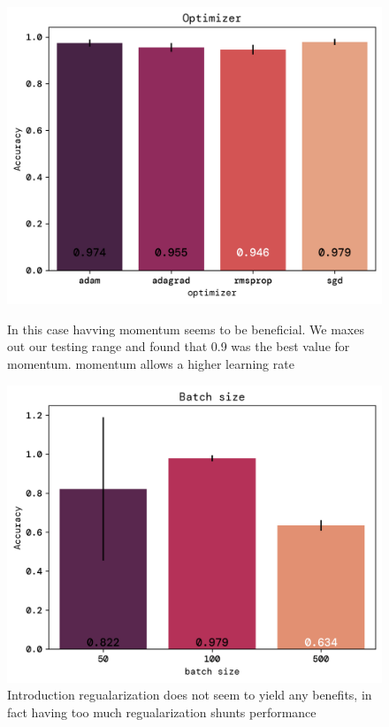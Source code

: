 \documentclass[twoside,11pt]{report}
\begin{document}
\begin{figure}[!ht]
    \begin{minipage}[t]{0.5\textwidth - 1mm}
        \begin{center}
            \includegraphics[width=\textwidth]{../runsAndFigures/accuracy_optimizer.png}
        \end{center}
        \caption{In this case havving momentum seems to be beneficial. We maxes out our testing range and found that 0.9 was the best value for momentum. momentum allows a higher learning rate}\label{fig:accuracy_optimizer}
    \end{minipage}
    \hspace{2mm}
    \begin{minipage}[t]{0.5\textwidth - 1mm}
        \begin{center}
            \includegraphics[width=\textwidth]{../runsAndFigures/accuracy_batch.png}
        \end{center}
        \caption{Introduction regualarization does not seem to yield any benefits, in fact
        having too much regualarization shunts performance}\label{fig:accuracy_aplha}
    \end{minipage}
\end{figure}
\end{document}

